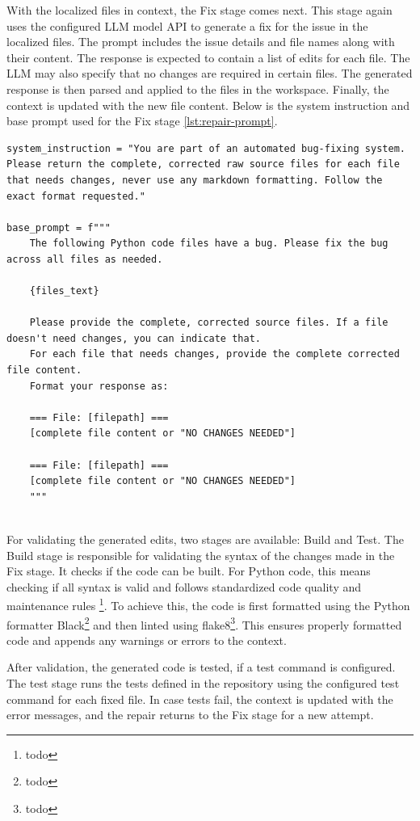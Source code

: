 With the localized files in context, the Fix stage comes next. This stage again uses the configured LLM model API to generate a fix for the issue in the localized files. The prompt includes the issue details and file names along with their content. The response is expected to contain a list of edits for each file. The LLM may also specify that no changes are required in certain files. The generated response is then parsed and applied to the files in the workspace. Finally, the context is updated with the new file content. Below is the system instruction and base prompt used for the Fix stage \ref{lst:repair-prompt}.

\begin{lstlisting}[caption={Repair Prompt}, label={lst:repair-prompt}]
system_instruction = "You are part of an automated bug-fixing system. Please return the complete, corrected raw source files for each file that needs changes, never use any markdown formatting. Follow the exact format requested."

base_prompt = f"""
    The following Python code files have a bug. Please fix the bug across all files as needed.

    {files_text}

    Please provide the complete, corrected source files. If a file doesn't need changes, you can indicate that.
    For each file that needs changes, provide the complete corrected file content.
    Format your response as:

    === File: [filepath] ===
    [complete file content or "NO CHANGES NEEDED"]

    === File: [filepath] ===
    [complete file content or "NO CHANGES NEEDED"]
    """
    
\end{lstlisting}

For validating the generated edits, two stages are available: Build and Test. The Build stage is responsible for validating the syntax of the changes made in the Fix stage. It checks if the code can be built. For Python code, this means checking if all syntax is valid and follows standardized code quality and maintenance rules \footnote{todo}. To achieve this, the code is first formatted using the Python formatter Black\footnote{todo} and then linted using flake8\footnote{todo}. This ensures properly formatted code and appends any warnings or errors to the context.

After validation, the generated code is tested, if a test command is configured. The test stage runs the tests defined in the repository using the configured test command for each fixed file. In case tests fail, the context is updated with the error messages, and the repair returns to the Fix stage for a new attempt.


